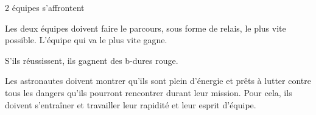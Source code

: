 \documentclass{grand-jeu}
\begin{document}
\begin{liste-materiel}
\end{liste-materiel}

\begin{regles}
2 équipes s'affrontent

Les deux équipes doivent faire le parcours, sous forme de relais, le plus vite possible. L’équipe qui va le plus vite gagne.

S’ils réussissent, ils gagnent des b-dures rouge.
\end{regles}

\begin{imaginaire}

Les astronautes doivent montrer qu'ils sont plein d'énergie et prêts à lutter contre tous les dangers qu'ils pourront rencontrer durant leur mission. Pour cela, ils doivent s'entraîner et travailler leur rapidité et leur esprit d'équipe.
\end{imaginaire}

\begin{moments-stop}
\end{moments-stop}
\end{document}
